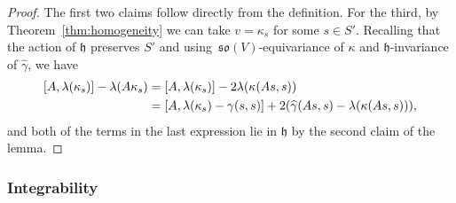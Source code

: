 \documentclass[11pt]{article}
\numberwithin{equation}{section}
\numberwithin{equation}{section}
\newcommand{\fh}{\mathfrak{h}}
\newcommand{\fso}{\mathfrak{so}}
\newcommand{\gammahat}{\widehat{\gamma}}
\newcommand{\1}{\mathbbm{1}}
\begin{document}
\begin{proof}
	The first two claims follow directly from the definition. For the third, by Theorem~\ref{thm:homogeneity} we can take $v=\kappa_s$ for some $s\in S'$. Recalling that the action of $\fh$ preserves $S'$ and using~$\fso(V)$-equivariance of $\kappa$ and $\fh$-invariance of $\gammahat$, we have
	\begin{align*}
		\comm{A}{\lambda(\kappa_s)} - \lambda(A\kappa_s)
		 &= \comm{A}{\lambda(\kappa_s)} - 2\lambda(\kappa(As,s))\\
		 &= \comm{A}{\lambda(\kappa_s)-\gamma(s,s)} + 2(\gammahat(As,s)-\lambda(\kappa(As,s))),
	\end{align*}
	and both of the terms in the last expression lie in $\fh$ by the second claim of the lemma.
\end{proof}

\subsubsection{Integrability}
\label{sec:integrability}
\end{document}
